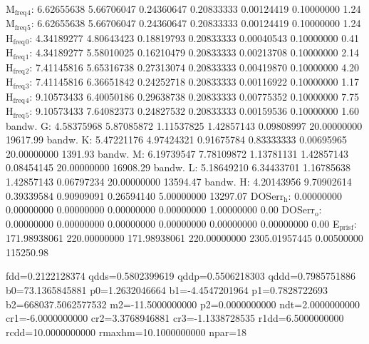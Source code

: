 \documentclass[11pt]{article}
\begin{document}
M\(_{\text{freq}}\)\(_{\text{4}}\):   6.62655638   5.66706047   0.24360647   0.20833333   0.00124419   0.10000000         1.24
M\(_{\text{freq}}\)\(_{\text{5}}\):   6.62655638   5.66706047   0.24360647   0.20833333   0.00124419   0.10000000         1.24
H\(_{\text{freq}}\)\(_{\text{0}}\):   4.34189277   4.80643423   0.18819793   0.20833333   0.00040543   0.10000000         0.41
H\(_{\text{freq}}\)\(_{\text{1}}\):   4.34189277   5.58010025   0.16210479   0.20833333   0.00213708   0.10000000         2.14
H\(_{\text{freq}}\)\(_{\text{2}}\):   7.41145816   5.65316738   0.27313074   0.20833333   0.00419870   0.10000000         4.20
H\(_{\text{freq}}\)\(_{\text{3}}\):   7.41145816   6.36651842   0.24252718   0.20833333   0.00116922   0.10000000         1.17
H\(_{\text{freq}}\)\(_{\text{4}}\):   9.10573433   6.40050186   0.29638738   0.20833333   0.00775352   0.10000000         7.75
H\(_{\text{freq}}\)\(_{\text{5}}\):   9.10573433   7.64082373   0.24827532   0.20833333   0.00159536   0.10000000         1.60
bandw. G:   4.58375968   5.87085872   1.11537825   1.42857143   0.09808997  20.00000000     19617.99
bandw. K:   5.47221176   4.97424321   0.91675784   0.83333333   0.00695965  20.00000000      1391.93
bandw. M:   6.19739547   7.78109872   1.13781131   1.42857143   0.08454145  20.00000000     16908.29
bandw. L:   5.18649210   6.34433701   1.16785638   1.42857143   0.06797234  20.00000000     13594.47
bandw. H:   4.20143956   9.70902614   0.39339584   0.90909091   0.26594140   5.00000000     13297.07
DOSerr\(_{\text{h}}\):   0.00000000   0.00000000   0.00000000   0.00000000   0.00000000   1.00000000         0.00
DOSerr\(_{\text{o}}\):   0.00000000   0.00000000   0.00000000   0.00000000   0.00000000   0.00000000         0.00
E\(_{\text{pris}}\)\(_{\text{f}}\): 171.98938061 220.00000000 171.98938061 220.00000000 2305.01957445   0.00500000    115250.98




fdd=0.2122128374 qdds=0.5802399619 qddp=0.5506218303 qddd=0.7985751886 b0=73.1365845881 p0=1.2632046664 b1=-4.4547201964 p1=0.7828722693 b2=668037.5062577532 m2=-11.5000000000 p2=0.0000000000 ndt=2.0000000000 cr1=-6.0000000000 cr2=3.3768946881 cr3=-1.1338728535 r1dd=6.5000000000 rcdd=10.0000000000 rmaxhm=10.1000000000 npar=18 
\end{document}
